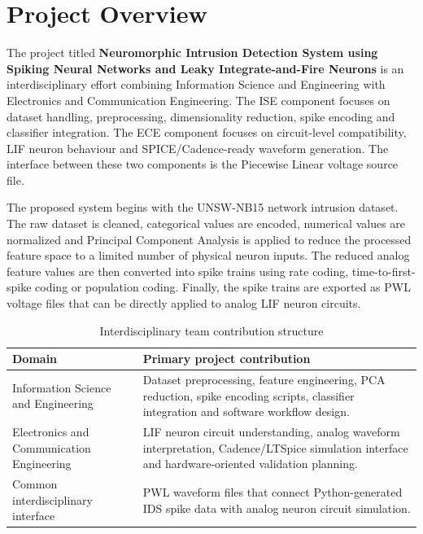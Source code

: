\section[Project Overview]{\textbf{Project Overview}}

The project titled \textbf{Neuromorphic Intrusion Detection System using Spiking Neural Networks and Leaky Integrate-and-Fire Neurons} is an interdisciplinary effort combining Information Science and Engineering with Electronics and Communication Engineering. The ISE component focuses on dataset handling, preprocessing, dimensionality reduction, spike encoding and classifier integration. The ECE component focuses on circuit-level compatibility, LIF neuron behaviour and SPICE/Cadence-ready waveform generation. The interface between these two components is the Piecewise Linear voltage source file.

The proposed system begins with the UNSW-NB15 network intrusion dataset. The raw dataset is cleaned, categorical values are encoded, numerical values are normalized and Principal Component Analysis is applied to reduce the processed feature space to a limited number of physical neuron inputs. The reduced analog feature values are then converted into spike trains using rate coding, time-to-first-spike coding or population coding. Finally, the spike trains are exported as PWL voltage files that can be directly applied to analog LIF neuron circuits.

\begin{table}[H]
\centering
\caption{Interdisciplinary team contribution structure}
\label{tab:teamstructure}
\begin{tabular}{|p{}|p{}|}
\hline
\textbf{Domain} & \textbf{Primary project contribution} \\
\hline
Information Science and Engineering & Dataset preprocessing, feature engineering, PCA reduction, spike encoding scripts, classifier integration and software workflow design. \\
\hline
Electronics and Communication Engineering & LIF neuron circuit understanding, analog waveform interpretation, Cadence/LTSpice simulation interface and hardware-oriented validation planning. \\
\hline
Common interdisciplinary interface & PWL waveform files that connect Python-generated IDS spike data with analog neuron circuit simulation. \\
\hline
\end{tabular}
\end{table}

